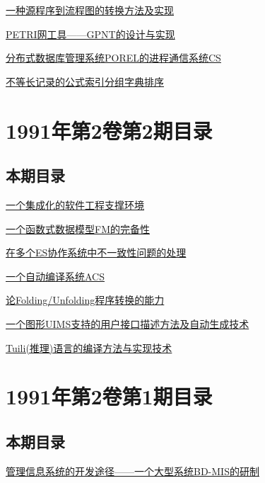 \documentclass[a4paper]{article}
\begin{document}
\href{http://www.jos.org.cn/ch/reader/download_pdf.aspx?file_no=19910306&year_id=1991&quarter_id=3&falg=1}{一种源程序到流程图的转换方法及实现}

\href{http://www.jos.org.cn/ch/reader/download_pdf.aspx?file_no=19910307&year_id=1991&quarter_id=3&falg=1}{PETRI网工具——GPNT的设计与实现}

\href{http://www.jos.org.cn/ch/reader/download_pdf.aspx?file_no=19910308&year_id=1991&quarter_id=3&falg=1}{分布式数据库管理系统POREL的进程通信系统CS}

\href{http://www.jos.org.cn/ch/reader/download_pdf.aspx?file_no=19910309&year_id=1991&quarter_id=3&falg=1}{不等长记录的公式索引分组字典排序}


\section{\textbf{1991年第2卷第2期目录}}
\subsection{本期目录}
\href{http://www.jos.org.cn/ch/reader/download_pdf.aspx?file_no=19910201&year_id=1991&quarter_id=2&falg=1}{一个集成化的软件工程支撑环境}

\href{http://www.jos.org.cn/ch/reader/download_pdf.aspx?file_no=19910202&year_id=1991&quarter_id=2&falg=1}{一个函数式数据模型FM的完备性}

\href{http://www.jos.org.cn/ch/reader/download_pdf.aspx?file_no=19910203&year_id=1991&quarter_id=2&falg=1}{在多个ES协作系统中不一致性问题的处理}

\href{http://www.jos.org.cn/ch/reader/download_pdf.aspx?file_no=19910204&year_id=1991&quarter_id=2&falg=1}{一个自动编译系统ACS}

\href{http://www.jos.org.cn/ch/reader/download_pdf.aspx?file_no=19910205&year_id=1991&quarter_id=2&falg=1}{论Folding/Unfolding程序转换的能力}

\href{http://www.jos.org.cn/ch/reader/download_pdf.aspx?file_no=19910206&year_id=1991&quarter_id=2&falg=1}{一个图形UIMS支持的用户接口描述方法及自动生成技术}

\href{http://www.jos.org.cn/ch/reader/download_pdf.aspx?file_no=19910207&year_id=1991&quarter_id=2&falg=1}{Tuili(推理)语言的编译方法与实现技术}


\section{\textbf{1991年第2卷第1期目录}}
\subsection{本期目录}
\href{http://www.jos.org.cn/ch/reader/download_pdf.aspx?file_no=19910101&year_id=1991&quarter_id=1&falg=1}{管理信息系统的开发途径——一个大型系统BD-MIS的研制}
\end{document}
